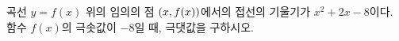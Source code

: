 곡선 $y=f(x)$ 위의 임의의 점 $(x{,}\mkern3mu\mathopen{}f(x))$에서의 접선의 기울기가 $x^2+2x-8$이다. 함수 $f(x)$의 극솟값이 $-8$일 때, 극댓값을 구하시오.
